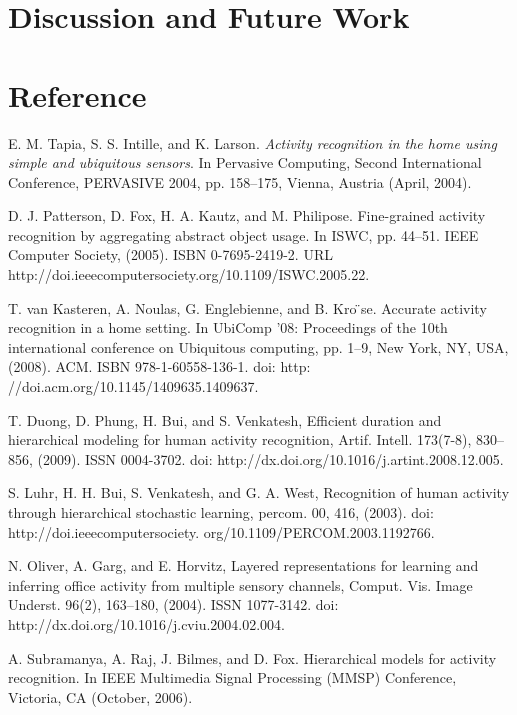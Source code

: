 \documentclass[11pt, oneside]{article}   	%
\begin{document}
\section{Discussion and Future Work}


\section{Reference}

\begin{thebibliography}{1}
	
 E. M. Tapia, S. S. Intille, and K. Larson. {\em Activity recognition in the home using simple and ubiquitous sensors}. In Pervasive Computing, Second International Conference, PERVASIVE 2004, pp. 158–175, Vienna, Austria (April, 2004).

  D. J. Patterson, D. Fox, H. A. Kautz, and M. Philipose. Fine-grained activity recognition by aggregating abstract object usage. In ISWC, pp. 44–51. IEEE Computer Society, (2005). ISBN 0-7695-2419-2. URL http://doi.ieeecomputersociety.org/10.1109/ISWC.2005.22.

  T. van Kasteren, A. Noulas, G. Englebienne, and B. Kro ̈se. Accurate activity recognition in a home setting. In UbiComp ’08: Proceedings of the 10th international conference on Ubiquitous computing, pp. 1–9, New York, NY, USA, (2008). ACM. ISBN 978-1-60558-136-1. doi: http: //doi.acm.org/10.1145/1409635.1409637.

  T. Duong, D. Phung, H. Bui, and S. Venkatesh, Efficient duration and hierarchical modeling for human activity recognition, Artif. Intell. 173(7-8), 830–856, (2009). ISSN 0004-3702. doi: http://dx.doi.org/10.1016/j.artint.2008.12.005.

  S. Luhr, H. H. Bui, S. Venkatesh, and G. A. West, Recognition of human activity through hierarchical stochastic learning, percom. 00, 416, (2003). doi: http://doi.ieeecomputersociety. org/10.1109/PERCOM.2003.1192766.

  N. Oliver, A. Garg, and E. Horvitz, Layered representations for learning and inferring office activity from multiple sensory channels, Comput. Vis. Image Underst. 96(2), 163–180, (2004). ISSN 1077-3142. doi: http://dx.doi.org/10.1016/j.cviu.2004.02.004.

  A. Subramanya, A. Raj, J. Bilmes, and D. Fox. Hierarchical models for activity recognition. In IEEE Multimedia Signal Processing (MMSP) Conference, Victoria, CA (October, 2006).


\end{thebibliography}
\end{document}
